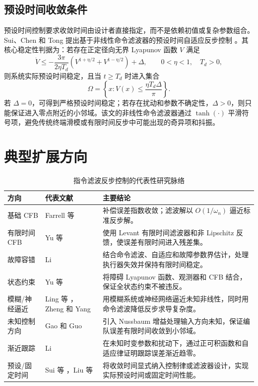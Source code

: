 \documentclass[UTF8,a4paper,11pt,fontset=fandol]{ctexart}
\begin{document}
\subsection{预设时间收敛条件}

预设时间控制要求收敛时间由设计者直接指定，而不是依赖初值或复杂参数组合。Sui、Chen 和 Tong 提出基于非线性命令滤波器的预设时间自适应反步控制 \cite{Sui2024Predefined}。其核心稳定性判据为：若存在正定径向无界 Lyapunov 函数 $V$ 满足
\begin{equation}
  \dot{V}\le
  -\frac{3\pi}{2\eta T_d}
  \left(V^{1+\eta/2}+V^{1-\eta/2}\right)+\Delta,
  \qquad 0<\eta<1,\quad T_d>0,
\end{equation}
则系统实际预设时间稳定，且当 $t\ge T_d$ 时进入集合
\begin{equation}
  \Omega=\left\{x:V(x)\le \frac{\eta T_d\Delta}{\pi}\right\}.
\end{equation}
若 $\Delta=0$，可得到严格预设时间稳定；若存在扰动和参数不确定性，$\Delta>0$，则只能保证进入零点附近的小邻域。该文的非线性命令滤波器通过 $\tanh(\cdot)$ 平滑符号项，避免传统终端滑模或有限时间反步中可能出现的奇异项和抖振。

\section{典型扩展方向}

\begin{table}[htbp]
\centering
\caption{指令滤波反步控制的代表性研究脉络}
\begin{tabular}{p{3.1cm}p{4.4cm}p{5.4cm}}
\toprule
方向 & 代表文献 & 主要结论 \\
\midrule
基础 CFB & Farrell 等 \cite{Farrell2009CFB} & 补偿误差指数收敛；滤波解以 $O(1/\omega_n)$ 逼近标准反步解。\\
有限时间 CFB & Yu 等 \cite{Yu2018FiniteTime} & 使用 Levant 有限时间滤波器和非 Lipschitz 反馈，使误差有限时间进入残差集。\\
故障容错 & Li \cite{Li2019FTC} & 结合命令滤波、自适应和故障参数界估计，处理执行器失效并保持有限时间稳定。\\
状态约束 & Yu 等 \cite{Yu2019Barrier} & 将障碍 Lyapunov 函数、观测器和 CFB 结合，保证全状态约束不被违反。\\
模糊/神经逼近 & Ling 等 \cite{Ling2020Fuzzy}，Zheng 和 Yang \cite{Zheng2020Universal} & 用模糊系统或神经网络逼近未知非线性，同时用命令滤波降低反步求导复杂度。\\
未知控制方向 & Gao 和 Guo \cite{Gao2020AUV} & 引入 Nussbaum 增益处理输入方向未知，保证编队误差有限时间收敛到小邻域。\\
渐近跟踪 & Li \cite{Li2022Asymptotic} & 在未知时变参数和扰动下，通过正可积函数和自适应律证明跟踪误差渐近趋零。\\
预设/固定时间 & Sui 等 \cite{Sui2024Predefined}，Liu 等 \cite{Liu2026USV} & 将收敛时间显式纳入控制律或滤波器设计，实现实际预设时间或固定时间性能。\\
\bottomrule
\end{tabular}
\end{table}
\end{document}
